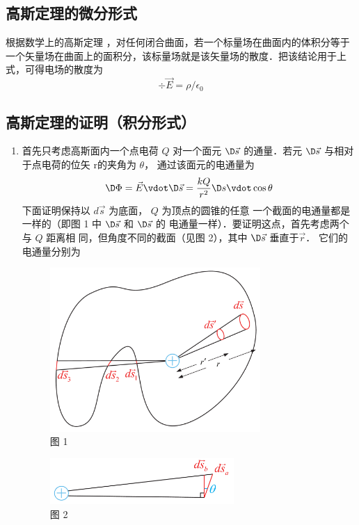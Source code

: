 \subsection{高斯定理的微分形式}

根据数学上的高斯定理%
，对任何闭合曲面，若一个标量场在曲面内的体积分等于一个矢量场在曲面上的面积分，该标量场就是该矢量场的散度．把该结论用于上式，可得电场的散度为
\begin{equation}
\div \vec E = \rho / \epsilon_0
\end{equation} 


\subsection{高斯定理的证明（积分形式）}
\begin{enumerate}
\item 首先只考虑高斯面内一个点电荷 $Q$ 对一个面元 $\D\vec s$ 的通量．若元 $\D\vec s$ 与相对于点电荷的位矢 \vec r的夹角为 $\theta $， 通过该面元的电通量为
\begin{equation}
\D \Phi  = \vec E \vdot \D \vec s = \frac{{kQ}}{{{r^2}}}\D s \vdot \cos \theta 
\end{equation} 
下面证明保持以 $d\vec s$ 为底面， $Q$ 为顶点的圆锥的任意
一个截面的电通量都是一样的（即图 1 中 $\D\vec s$ 和 $\D\vec s$ 的
电通量一样）．要证明这点，首先考虑两个与 $Q$ 距离相
同，但角度不同的截面（见图 2），其中 $\D\vec s$ 垂直于$\vec r$． 它们的电通量分别为
\begin{figure}[ht]
\centering
\includegraphics[width=8cm]{./figures/EGauss1.pdf}
\caption{图 1}
\end{figure}
\begin{figure}[ht]
\centering
\includegraphics[width=7cm]{./figures/EGauss2.pdf}
\caption{图 2}
\end{figure}


\end{enumerate}
